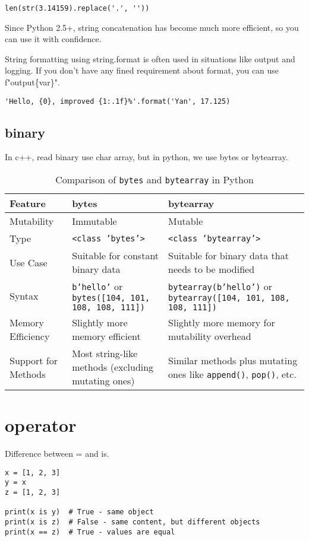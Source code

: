 \documentclass[a4paper,12pt,twoside]{book}
\begin{document}
\begin{lstlisting}
len(str(3.14159).replace('.', ''))
\end{lstlisting}

Since Python 2.5+, string concatenation has become much more efficient, so you can use it with confidence. 

String formatting using string.format is often used in situations like output and logging. If you don't have any fined requirement about format, you can use f"output\{var\}". 

\begin{lstlisting}
'Hello, {0}, improved {1:.1f}%'.format('Yan', 17.125)
\end{lstlisting}


\subsection{binary}

In c++, read binary use char array, but in python, we use bytes or bytearray.

\begin{table}[h!]
	\centering
	\begin{tabular}{|p{}|p{}|p{}|}
		\hline
		\textbf{Feature} & \textbf{bytes} & \textbf{bytearray} \\
		\hline
		Mutability & Immutable & Mutable \\
		\hline
		Type & \texttt{<class 'bytes'>} & \texttt{<class 'bytearray'>} \\
		\hline
		Use Case & Suitable for constant binary data & Suitable for binary data that needs to be modified \\
		\hline
		Syntax & \texttt{b'hello'} or \texttt{bytes([104, 101, 108, 108, 111])} & \texttt{bytearray(b'hello')} or \texttt{bytearray([104, 101, 108, 108, 111])} \\
		\hline
		Memory Efficiency & Slightly more memory efficient & Slightly more memory for mutability overhead \\
		\hline
		Support for Methods & Most string-like methods (excluding mutating ones) & Similar methods plus mutating ones like \texttt{append()}, \texttt{pop()}, etc. \\
		\hline
	\end{tabular}
	\caption{Comparison of \texttt{bytes} and \texttt{bytearray} in Python}
\end{table}

\section{operator}
Difference between = and is.
\begin{lstlisting}
x = [1, 2, 3]
y = x
z = [1, 2, 3]

print(x is y)  # True - same object
print(x is z)  # False - same content, but different objects
print(x == z)  # True - values are equal
\end{lstlisting}
\end{document}
